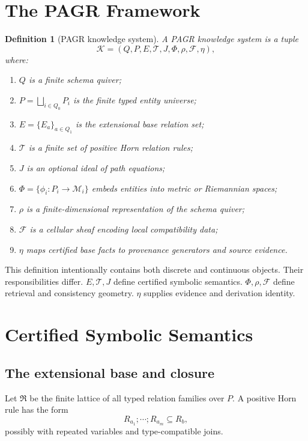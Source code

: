 \documentclass[11pt]{article}
\newtheorem{definition}{Definition}[section]
\newcommand{\KG}{\mathcal{K}}
\newcommand{\T}{\mathcal{T}}
\newcommand{\F}{\mathcal{F}}
\newcommand{\M}{\mathcal{M}}
\begin{document}
\section{The PAGR Framework}

\begin{definition}[PAGR knowledge system]
\label{def:pagr}
A \emph{PAGR knowledge system} is a tuple
\[
\KG=(Q,P,E,\T,J,\Phi,\rho,\F,\eta),
\]
where:
\begin{enumerate}[leftmargin=*]
    \item $Q$ is a finite schema quiver;
    \item $P=\bigsqcup_{i\in Q_0}P_i$ is the finite typed entity universe;
    \item $E=\{E_a\}_{a\in Q_1}$ is the extensional base relation set;
    \item $\T$ is a finite set of positive Horn relation rules;
    \item $J$ is an optional ideal of path equations;
    \item $\Phi=\{\phi_i:P_i\to \M_i\}$ embeds entities into metric or Riemannian spaces;
    \item $\rho$ is a finite-dimensional representation of the schema quiver;
    \item $\F$ is a cellular sheaf encoding local compatibility data;
    \item $\eta$ maps certified base facts to provenance generators and source evidence.
\end{enumerate}
\end{definition}

This definition intentionally contains both discrete and continuous objects. Their responsibilities differ. $E,\T,J$ define certified symbolic semantics. $\Phi,\rho,\F$ define retrieval and consistency geometry. $\eta$ supplies evidence and derivation identity.

\section{Certified Symbolic Semantics}
\label{sec:certified}

\subsection{The extensional base and closure}
Let $\mathfrak{R}$ be the finite lattice of all typed relation families over $P$. A positive Horn rule has the form
\[
R_{a_1};\cdots;R_{a_m}\subseteq R_b,
\]
possibly with repeated variables and type-compatible joins.
\end{document}
